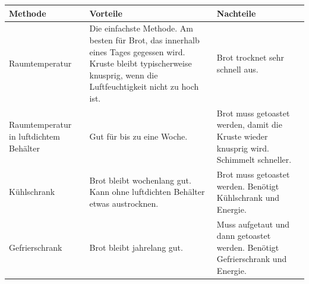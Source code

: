 \def\arraystretch{1.6}
\begin{tabular}{@{}p{}p{}p{}@{}}
\toprule
\textbf{Methode}     & \textbf{Vorteile}            & \textbf{Nachteile}       \\
\midrule
Raumtemperatur                          & Die einfachste Methode. Am besten für Brot, das innerhalb eines Tages gegessen wird.
                                            Kruste bleibt typischerweise knusprig, wenn die Luftfeuchtigkeit nicht zu hoch ist.
                                          & Brot trocknet sehr schnell aus.\\

Raumtemperatur in luftdichtem Behälter    & Gut für bis zu eine Woche.
                                          & Brot muss getoastet werden, damit die Kruste wieder knusprig wird. Schimmelt schneller.\\

Kühlschrank                                    & Brot bleibt wochenlang gut. Kann ohne luftdichten Behälter etwas austrocknen.
                                          & Brot muss getoastet werden. Benötigt Kühlschrank und Energie.\\

Gefrierschrank                                   & Brot bleibt jahrelang gut.
                                          & Muss aufgetaut und dann getoastet werden. Benötigt Gefrierschrank und Energie.\\
\bottomrule
\end{tabular}
